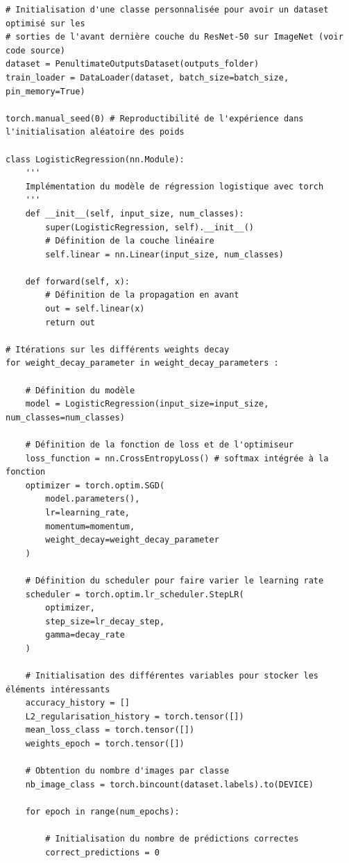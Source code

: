 \documentclass[12pt,english, openany]{book}
\begin{document}
\begin{verbatim}
# Initialisation d'une classe personnalisée pour avoir un dataset optimisé sur les 
# sorties de l'avant dernière couche du ResNet-50 sur ImageNet (voir code source)
dataset = PenultimateOutputsDataset(outputs_folder)
train_loader = DataLoader(dataset, batch_size=batch_size, pin_memory=True)

torch.manual_seed(0) # Reproductibilité de l'expérience dans l'initialisation aléatoire des poids
 
class LogisticRegression(nn.Module): 
    '''
    Implémentation du modèle de régression logistique avec torch
    '''
    def __init__(self, input_size, num_classes): 
        super(LogisticRegression, self).__init__()
        # Définition de la couche linéaire
        self.linear = nn.Linear(input_size, num_classes) 
  
    def forward(self, x):
        # Définition de la propagation en avant
        out = self.linear(x) 
        return out

# Itérations sur les différents weights decay
for weight_decay_parameter in weight_decay_parameters :
    
    # Définition du modèle
    model = LogisticRegression(input_size=input_size, num_classes=num_classes) 

    # Définition de la fonction de loss et de l'optimiseur
    loss_function = nn.CrossEntropyLoss() # softmax intégrée à la fonction
    optimizer = torch.optim.SGD(
        model.parameters(), 
        lr=learning_rate, 
        momentum=momentum, 
        weight_decay=weight_decay_parameter
    )

    # Définition du scheduler pour faire varier le learning rate
    scheduler = torch.optim.lr_scheduler.StepLR(
        optimizer, 
        step_size=lr_decay_step, 
        gamma=decay_rate
    )
    
    # Initialisation des différentes variables pour stocker les éléments intéressants
    accuracy_history = []
    L2_regularisation_history = torch.tensor([])
    mean_loss_class = torch.tensor([])
    weights_epoch = torch.tensor([])

    # Obtention du nombre d'images par classe
    nb_image_class = torch.bincount(dataset.labels).to(DEVICE)
    
    for epoch in range(num_epochs): 
            
        # Initialisation du nombre de prédictions correctes
        correct_predictions = 0
    

\end{verbatim}
\end{document}
